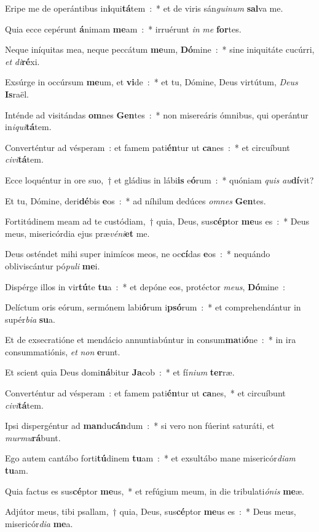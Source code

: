 ﻿\item Eripe me de operántibus in\textbf{i}qui\textbf{tá}tem~:~* et de viris sán\emph{gui}\emph{num} \textbf{sal}va me.
\item Quia ecce cepérunt \textbf{á}nimam \textbf{me}am~:~* irruérunt \emph{in} \emph{me} \textbf{for}tes.
\item Neque iníquitas mea, neque peccátum \textbf{me}um, \textbf{Dó}mine~:~* sine iniquitáte cucúrri, \emph{et} \emph{di}\textbf{ré}xi.
\item Exsúrge in occúrsum \textbf{me}um, et \textbf{vi}de~:~* et tu, Dómine, Deus virtútum, \emph{De}\emph{us} \textbf{Is}raël.
\item Inténde ad visitándas \textbf{om}nes \textbf{Gen}tes~:~* non misereáris ómnibus, qui operántur in\emph{i}\emph{qui}\textbf{tá}tem.
\item Converténtur ad vésperam~: et famem pati\textbf{én}tur ut \textbf{ca}nes~:~* et circuíbunt \emph{ci}\emph{vi}\textbf{tá}tem.
\item Ecce loquéntur in ore suo,~† et gládius in lábi\textbf{is} e\textbf{ó}rum~:~* quóniam \emph{quis} \emph{au}\textbf{dí}vit?
\item Et tu, Dómine, deri\textbf{dé}bis \textbf{e}os~:~* ad níhilum dedúces \emph{om}\emph{nes} \textbf{Gen}tes.
\item Fortitúdinem meam ad te custódiam,~† quia, Deus, sus\textbf{cép}tor \textbf{me}us es~:~* Deus meus, misericórdia ejus præ\emph{vé}\emph{ni}\textbf{et} me.
\item Deus osténdet mihi super inimícos meos, ne oc\textbf{cí}das \textbf{e}os~:~* nequándo obliviscántur pó\emph{pu}\emph{li} \textbf{me}i.
\item Dispérge illos in vir\textbf{tú}te \textbf{tu}a~:~* et depóne eos, protéctor \emph{me}\emph{us}, \textbf{Dó}mine~:
\item Delíctum oris eórum, sermónem labi\textbf{ó}rum i\textbf{psó}rum~:~* et comprehendántur in supér\emph{bi}\emph{a} \textbf{su}a.
\item Et de exsecratióne et mendácio annuntiabúntur in consum\textbf{ma}ti\textbf{ó}ne~:~* in ira consummatiónis, \emph{et} \emph{non} \textbf{e}runt.
\item Et scient quia Deus domi\textbf{ná}bitur \textbf{Ja}cob~:~* et fí\emph{ni}\emph{um} \textbf{ter}ræ.
\item Converténtur ad vésperam~: et famem pati\textbf{én}tur ut \textbf{ca}nes,~* et circuíbunt \emph{ci}\emph{vi}\textbf{tá}tem.
\item Ipsi dispergéntur ad \textbf{man}du\textbf{cán}dum~:~* si vero non fúerint saturáti, et \emph{mur}\emph{mu}\textbf{rá}bunt.
\item Ego autem cantábo forti\textbf{tú}dinem \textbf{tu}am~:~* et exsultábo mane misericór\emph{di}\emph{am} \textbf{tu}am.\ifx\lalinebreakaftereighteen\undefined\else\\\fi
\item Quia factus es sus\textbf{cé}ptor \textbf{me}us,~* et refúgium meum, in die tribulati\emph{ó}\emph{nis} \textbf{me}æ.
\item Adjútor meus, tibi psallam,~† quia, Deus, sus\textbf{cé}ptor \textbf{me}us es~:~* Deus meus, misericór\emph{di}\emph{a} \textbf{me}a.